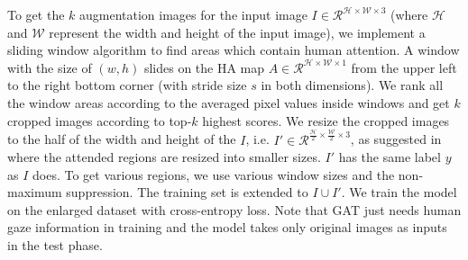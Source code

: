 \documentclass{bmvc2k}
\begin{document}
To get the $k$ augmentation images for the input image $I\in \mathcal{R}^{\mathcal{H} \times \mathcal{W} \times 3}$ (where $\mathcal{H}$ and $\mathcal{W}$ represent the width and height of the input image), we implement a sliding window algorithm to find areas which contain human attention. A window with the size of $(w,h)$ slides on the HA map $A \in \mathcal{R}^{\mathcal{H} \times \mathcal{W} \times 1}$ from the upper left to the right bottom corner (with stride size $s$ in both dimensions). We rank all the window areas according to the averaged pixel values inside windows and get $k$ cropped images according to top-$k$ highest scores. We resize the cropped images to the half of the width and height of the $I$, i.e. $I'\in \mathcal{R}^{\frac{\mathcal{H}}{2} \times \frac{\mathcal{W}}{2} \times 3}$, as suggested in \cite{sermanet2014attention,fu2017look, zheng2017learning} where the attended regions are resized into smaller sizes.
$I'$ has the same label $y$ as $I$ does. To get various regions, we use various window sizes and the non-maximum suppression. The training set is extended to $I \cup I'$. We train the model on the enlarged dataset with cross-entropy loss. Note that GAT just needs human gaze information in training and the model takes only original images as inputs in the test phase. 
\end{document}
